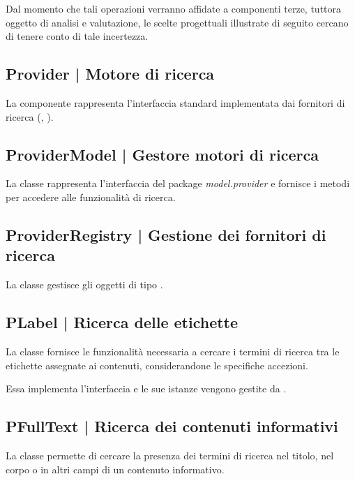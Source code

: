 \documentclass[10pt,a4paper,headinclude,footinclude,hidelinks]{scrreprt} %
\begin{document}
	Dal momento che tali operazioni verranno affidate a componenti terze, tuttora oggetto di analisi e valutazione, le scelte progettuali illustrate di seguito cercano di tenere conto di tale incertezza.

	\subsection[Provider]{Provider | Motore di ricerca}
	\label{sec:stage:design:model.search:search-provider}
	La componente rappresenta l'interfaccia standard implementata dai fornitori di ricerca (\textit{}, \textit{}).

	\subsection[ProviderModel]{ProviderModel | Gestore motori di ricerca}
	\label{sec:stage:design:model.search:provider-model}
	La classe \textit{} rappresenta l'interfaccia del package \textit{model.provider} e fornisce i metodi per accedere alle funzionalità di ricerca.

	\subsection[ProviderRegistry]{ProviderRegistry | Gestione dei fornitori di ricerca}
	\label{sec:stage:design:model.search:provider-registry}
	La classe \textit{} gestisce gli oggetti di tipo \textit{}.

	\subsection[PLabel]{PLabel | Ricerca delle etichette}
	\label{sec:stage:design:model.search:tag-provider}
	La classe \textit{} fornisce le funzionalità necessaria a cercare i termini di ricerca tra le etichette assegnate ai contenuti, considerandone le specifiche accezioni.

	Essa implementa l'interfaccia \textit{} e le sue istanze vengono gestite da \textit{}.

	\subsection[PFullText]{PFullText | Ricerca dei contenuti informativi}
	\label{sec:stage:design:model.search:full-text-provider}
	La classe \textit{} permette di cercare la presenza dei termini di ricerca nel titolo, nel corpo o in altri campi di un contenuto informativo.
\end{document}
